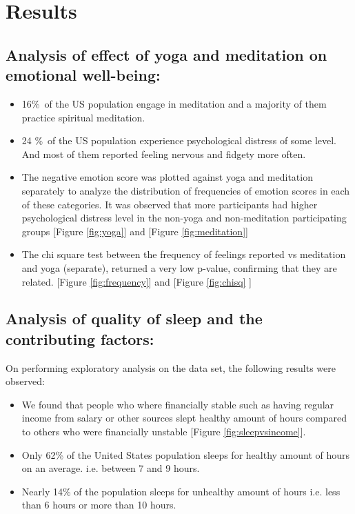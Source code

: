 \documentclass[12pt]{article}
\begin{document}
\section{Results}

\subsection{Analysis of effect of yoga and meditation on emotional well-being:}
\begin{itemize}
\item 16\%\ of the US population engage in meditation and a majority of them practice spiritual meditation.

\item 24 \%\ of the US population experience psychological distress of some level.  And most of them reported feeling nervous and fidgety more often. 
   
    \item The negative emotion score was plotted against yoga and meditation separately to analyze the distribution of frequencies of emotion scores in each of these categories. It was observed that more participants had higher psychological distress level in the non-yoga and non-meditation participating groups [Figure \ref{fig:yoga}] and [Figure \ref{fig:meditation}]
    
    \item The chi square test between the frequency of feelings reported vs meditation and yoga (separate), returned a very low p-value, confirming that they are related. [Figure \ref{fig:frequency}] and [Figure \ref{fig:chisq} ]
\end{itemize}
 
\subsection{Analysis of quality of sleep and the contributing factors:}
On performing exploratory analysis on the data set, the following results were observed:
\begin{itemize}
    \item We found that people who where financially stable such as having regular income from salary or other sources slept healthy amount of hours compared to others who were financially unstable [Figure \ref{fig:sleepvsincome}]. 
    \item Only 62\% of the United States population sleeps for healthy amount of hours on an average. i.e. between 7 and 9 hours.
    \item Nearly 14\% of the population sleeps for unhealthy amount of hours i.e. less than 6 hours or more than 10 hours.
\end{itemize}
\end{document}
